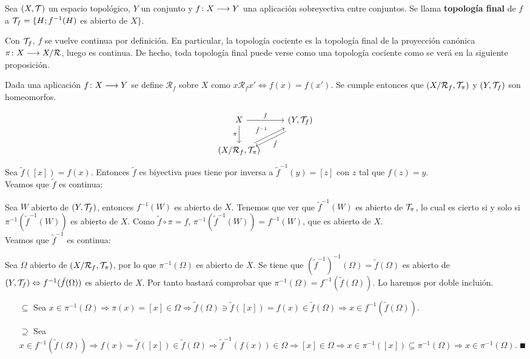 \documentclass[GTS.tex]{subfiles}
\begin{document}
\begin{defi}Sea $(X,\mathcal{T})$ un espacio topológico, $Y$ un conjunto y $f\colon{X}\longrightarrow{Y}$ una aplicación sobreyectiva entre conjuntos. Se llama \textbf{topología final} de $f$ a $\mathcal{T}_f=\{H ; f^{-1}(H)$ es abierto de $X\}$.
\end{defi}
\begin{observacion}  Con $\mathcal{T}_f$, $f$ se vuelve continua por definición. En particular, la topología cociente es la topología final de la proyección canónica $\pi\colon{X}\longrightarrow{X/\mathcal{R}}$, luego es continua. De hecho, toda topología final puede verse como una topología cociente como se verá en la siguiente proposición.
\end{observacion}
\begin{prop}\label{146} Dada una aplicación $f\colon{X}\longrightarrow{Y}$ se define $\mathcal{R}_f$ sobre $X$ como $x\mathcal{R}_f x'\Leftrightarrow f(x)=f(x')$. Se cumple entonces que $\left(X/\mathcal{R}_f,\mathcal{T}_\pi\right)$ y $(Y,\mathcal{T}_f)$ son homeomorfos.
\end{prop}
\begin{dem}
\[
\begin{tikzcd}
X \ar[r, "f"]\arrow[d,"\pi "'] & \left(Y,\Tau_f\right)\arrow[dl,shift left=1ex,"\tilde{f} "]\\
\left(X/\mathcal{R}_f,\Tau_\pi\right) \arrow[ur,"\tilde{f}^{-1} "]
\end{tikzcd}
\]
Sea $\tilde{f}([x])=f(x)$. Entonces $\tilde{f}$ es biyectiva pues tiene por inversa a $\tilde{f}^{-1}(y)=[z]$ con $z$ tal que $f(z)=y$.\\
Veamos que $\tilde{f}$ es continua:

Sea $W$ abierto de $(Y,\mathcal{T}_f)$, entonces $f^{-1}(W)$ es abierto de $X$. Tenemos que ver que $\tilde{f}^{-1}(W)$ es abierto de $\mathcal{T}_\pi$, lo cual es cierto si y solo si $\pi^{-1}(\tilde{f}^{-1}(W))$ es abierto de $X$. Como $\tilde{f}\circ\pi=f$, $\pi^{-1}(\tilde{f}^{-1}(W))=f^{-1}(W)$, que es abierto de $X$.\\
Veamos que $\tilde{f}^{-1}$ es continua:

Sea $\Omega$ abierto de $(X/\mathcal{R}_f,\mathcal{T}_\pi)$, por lo que $\pi^{-1}(\Omega)$ es abierto de $X$. Se tiene que $(\tilde{f}^{-1})^{-1}(\Omega)=\tilde{f}(\Omega)$ es abierto de $(Y,\mathcal{T}_f)\Leftrightarrow f^{-1}(\tilde{f}(\Omega))$ es abierto de $X$. Por tanto bastará comprobar que $\pi^{-1}(\Omega)=f^{-1}(\tilde{f}(\Omega))$. Lo haremos por doble incluión.
\begin{enumerate}
\item[$\boxed{\subseteq}$] Sea $x\in\pi^{-1}(\Omega)\Rightarrow\pi(x)=[x]\in\Omega\Rightarrow\tilde{f}(\Omega)\ni\tilde{f}([x])=f(x)\in\tilde{f}(\Omega)\Rightarrow x\in f^{-1}(\tilde{f}(\Omega))$.
\item[$\boxed{\supseteq}$] Sea $x\in f^{-1}(\tilde{f}(\Omega))\Rightarrow f(x)=\tilde{f}([x])\in\tilde{f}(\Omega)\Rightarrow\tilde{f}^{-1}(f(x))\in\Omega\Rightarrow [x]\in\Omega\Rightarrow x\in\pi^{-1}([x])\subseteq\pi^{-1}(\Omega)\Rightarrow x\in\pi^{-1}(\Omega)$. $\QED$
\end{enumerate}
\end{dem}
\end{document}
